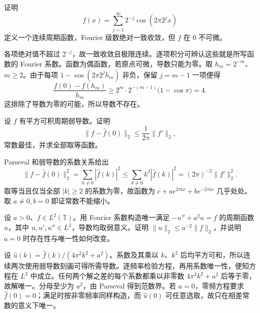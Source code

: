 \begin{exercise}\label{b2:ex:02-lacunary-nondifferentiable}
证明
\[
 f(x)=\sum_{j=1}^\infty2^{-j}\cos(2\pi2^jx)
\]
定义一个连续周期函数，Fourier 级数绝对一致收敛，但 \(f\) 在 \(0\) 不可微。
\end{exercise}
\begin{solution}
各项绝对值不超过 \(2^{-j}\)，故一致收敛且极限连续。逐项积分可辨认这些就是所写函数的 Fourier 系数。函数为偶函数，若原点可微，导数只能为零。取 \(h_m=2^{-m}\)、\(m\geq2\)。由于每项 \(1-\cos(2\pi2^jh_m)\) 非负，保留 \(j=m-1\) 一项便得
\[
 \dfrac{f(0)-f(h_m)}{h_m}
 \geq 2^m\cdot2^{-(m-1)}\bigl(1-\cos\pi\bigr)=4.
\]
这排除了导数为零的可能，所以导数不存在。
\end{solution}

\begin{exercise}\label{b2:ex:02-sharp-poincare}
设 \(f\) 有平方可积周期弱导数。证明
\[
 \|f-\widehat f(0)\|_2\leq\dfrac1{2\pi}\|f'\|_2,
\]
常数最佳，并求全部取等函数。
\end{exercise}
\begin{solution}
Parseval 和弱导数的系数关系给出
\[
 \|f-\widehat f(0)\|_2^2=\sum_{k\ne0}|\widehat f(k)|^2
 \leq\sum_{k\ne0}k^2|\widehat f(k)|^2=(2\pi)^{-2}\|f'\|_2^2.
\]
取等当且仅当全部 \(|k|\geq2\) 的系数为零，故函数为 \(c+ae^{2\pi\mathrm{i}x}+be^{-2\pi\mathrm{i}x}\) 几乎处处。取 \(a\ne0,b=0\) 即证常数不能缩小。
\end{solution}

\begin{exercise}\label{b2:ex:02-periodic-resolvent}
设 \(a>0\)、\(f\in L^2(\mathbb T)\)。用 Fourier 系数构造唯一满足 \(-u''+a^2u=f\) 的周期函数 \(u\)，其中 \(u,u',u''\in L^2\)，导数均取弱意义。证明 \(\|u\|_2\leq a^{-2}\|f\|_2\)，并说明 \(a=0\) 时存在性与唯一性如何改变。
\end{exercise}
\begin{solution}
设 \(\widehat u(k)=\widehat f(k)/(4\pi^2k^2+a^2)\)。系数及其乘以 \(k\)、\(k^2\) 后均平方可和，所以连续两次使用弱导数刻画可得所需导数。逐频率检验方程，再用系数唯一性，便知方程在 \(L^2\) 中成立。任何两个解之差的每个系数都乘以非零数 \(4\pi^2k^2+a^2\) 后等于零，故解唯一。分母至少为 \(a^2\)，由 Parseval 得到范数界。若 \(a=0\)，零频方程要求 \(\widehat f(0)=0\)；满足时按非零频率同样构造，而 \(\widehat u(0)\) 可任意选取，故只在相差常数的意义下唯一。
\end{solution}

